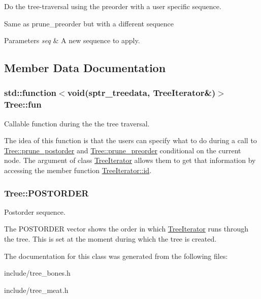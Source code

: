 Do the tree-\/traversal using the preorder with a user specific sequence. 

Same as {\ttfamily prune\+\_\+preorder} but with a different sequence 
\begin{DoxyParams}{Parameters}
{\em seq} & A new sequence to apply. \\
\hline
\end{DoxyParams}


\subsection{Member Data Documentation}
\subsubsection[{\texorpdfstring{fun}{fun}}]{\setlength{\rightskip}{0pt plus 5cm}std\+::function$<$void({\bf sptr\+\_\+treedata}, {\bf Tree\+Iterator}\&)$>$ Tree\+::fun}\hypertarget{classTree_ad98f51efc931f96c687c65d4387d19e9}{}\label{classTree_ad98f51efc931f96c687c65d4387d19e9}


Callable function during the the tree traversal. 

The idea of this function is that the users can specify what to do during a call to \hyperlink{classTree_a7d465880d18acf79f3a772ea5412b0d7}{Tree\+::prune\+\_\+postorder} and \hyperlink{classTree_ac85bfb083b3856e65987e1d15885a61c}{Tree\+::prune\+\_\+preorder} conditional on the current node. The argument of class \hyperlink{classTreeIterator}{Tree\+Iterator} allows them to get that information by accessing the member function \hyperlink{classTreeIterator_a80badcbb276e0aa78216f5ef6ff91b62}{Tree\+Iterator\+::id}. 
\subsubsection[{\texorpdfstring{P\+O\+S\+T\+O\+R\+D\+ER}{POSTORDER}}]{ Tree\+::\+P\+O\+S\+T\+O\+R\+D\+ER\hspace{0.3cm}{\ttfamily [protected]}}\hypertarget{classTree_a310e76b803db38e7067514822b21a58f}{}\label{classTree_a310e76b803db38e7067514822b21a58f}


Postorder sequence. 

The P\+O\+S\+T\+O\+R\+D\+ER vector shows the order in which \hyperlink{classTreeIterator}{Tree\+Iterator} runs through the tree. This is set at the moment during which the tree is created. 

The documentation for this class was generated from the following files\+:\begin{DoxyCompactItemize}
\item 
include/tree\+\_\+bones.\+h\item 
include/tree\+\_\+meat.\+h\end{DoxyCompactItemize}
